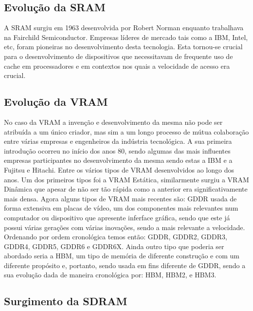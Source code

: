 \documentclass{report}
\begin{document}
\subsection{Evolução da \ac{SRAM}}

\par A \ac{SRAM} surgiu em 1963 desenvolvida por Robert Norman enquanto trabalhava na Fairchild Semiconductor. Empresas líderes de mercado tais como a IBM, Intel, etc, foram pioneiras no desenvolvimento desta tecnologia. Esta tornou-se crucial para o desenvolvimento de dispositivos que necessitavam de frequente uso de cache em processadores e em contextos nos quais a velocidade de acesso era crucial.

\subsection{Evolução da \ac{VRAM}}

\par No caso da \ac{VRAM} a invenção e desenvolvimento da mesma não pode ser atribuída a um único criador, mas sim a um longo processo de mútua colaboração entre várias empresas e engenheiros da indústria tecnológica. A sua primeira introdução ocorreu no início dos anos 80, sendo algumas das mais influentes empresas participantes no desenvolvimento da mesma sendo estas a IBM e a Fujitsu e Hitachi. Entre os vários tipos de \ac{VRAM} desenvolvidos ao longo dos anos. Um dos primeiros tipos foi a \ac{VRAM} Estática, similarmente surgiu a \ac{VRAM} Dinâmica que apesar de não ser tão rápida como a anterior era significativamente mais densa. Agora alguns tipos de \ac{VRAM} mais recentes são: \ac{GDDR} usada de forma extensiva em placas de vídeo, um dos componentes mais relevantes num computador ou dispositivo que apresente inferface gráfica, sendo que este já possui várias gerações com várias inovações, sendo a mais relevante a velocidade. Ordenando por ordem cronológica temos então: \ac{GDDR}, \ac{GDDR}2, \ac{GDDR}3, \ac{GDDR}4, \ac{GDDR}5, \ac{GDDR}6 e \ac{GDDR}6X. Ainda outro tipo que poderia ser abordado seria a \ac{HBM}, um tipo de memória de diferente construção e com um diferente propósito e, portanto, sendo usada em fins diferente de GDDR, sendo a sua evolução dada de maneira cronológica por: \ac{HBM}, \ac{HBM}2, e \ac{HBM}3.

\subsection{Surgimento da \ac{SDRAM}}
\end{document}
